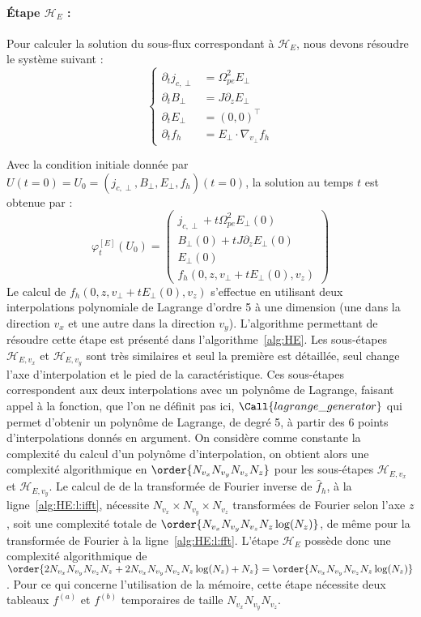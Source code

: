\paragraph{Étape $\mathcal{H}_E$ :}
Pour calculer la solution du sous-flux correspondant à $\mathcal{H}_E$, nous devons résoudre le système suivant :
$$
  \begin{cases}
    \partial_t j_{c,\perp} &= \Omega_{pe}^2E_{\perp} \\
    \partial_t B_\perp     &= J\partial_zE_\perp \\
    \partial_t E_\perp     &= (0,0)^\top \\
    \partial_t f_h         &= E_\perp\cdot\nabla_{v_\perp}f_h
  \end{cases}
$$

Avec la condition initiale donnée par $U(t=0)=U_0=(j_{c,\perp},B_\perp,E_\perp,f_h)(t=0)$, la solution au temps $t$ est obtenue par :
$$
  \varphi_t^{[E]}(U_0) = \begin{pmatrix}
    j_{c,\perp} + t\Omega_{pe}^2E_{\perp}(0)\\
    B_\perp(0)+tJ\partial_zE_\perp(0) \\
    E_\perp(0) \\
    f_h(0,z,v_\perp+tE_\perp(0),v_z)
  \end{pmatrix}
$$
Le calcul de $f_h(0,z,v_\perp+tE_\perp(0),v_z)$ s'effectue en utilisant deux interpolations polynomiale de Lagrange d'ordre 5 à une dimension (une dans la direction $v_x$ et une autre dans la direction $v_y$). L'algorithme permettant de résoudre cette étape est présenté dans l'algorithme~\ref{alg:HE}. Les sous-étapes $\mathcal{H}_{E,v_x}$ et $\mathcal{H}_{E,v_y}$ sont très similaires et seul la première est détaillée, seul change l'axe d'interpolation et le pied de la caractéristique. Ces sous-étapes correspondent aux deux interpolations avec un polynôme de Lagrange, faisant appel à la fonction, que l'on ne définit pas ici, $\Call{lagrange\_generator}$ qui permet d'obtenir un polynôme de Lagrange, de degré 5, à partir des 6 points d'interpolations donnés en argument. On considère comme constante la complexité du calcul d'un polynôme d'interpolation, on obtient alors une complexité algorithmique en $\order{N_{v_x}N_{v_y}N_{v_z}N_z}$ pour les sous-étapes $\mathcal{H}_{E,{v_x}}$ et $\mathcal{H}_{E,{v_y}}$. Le calcul de de la transformée de Fourier inverse de $\hat{f}_h$, à la ligne~\ref{alg:HE:l:ifft}, nécessite $N_{v_x}\times N_{v_y}\times N_{v_z}$ transformées de Fourier selon l'axe $z$, soit une complexité totale de $\order{N_{v_x}N_{v_y}N_{v_z}N_z\log(N_z)}$, de même pour la transformée de Fourier à la ligne~\ref{alg:HE:l:fft}. L'étape $\mathcal{H}_{E}$ possède donc une complexité algorithmique de $\order{2N_{v_x}N_{v_y}N_{v_z}N_z + 2N_{v_x}N_{v_y}N_{v_z}N_z\log(N_z) + N_z} = \order{N_{v_x}N_{v_y}N_{v_z}N_z\log(N_z)}$. Pour ce qui concerne l'utilisation de la mémoire, cette étape nécessite deux tableaux $f^{(a)}$ et $f^{(b)}$ temporaires de taille $N_{v_x}N_{v_y}N_{v_z}$.
